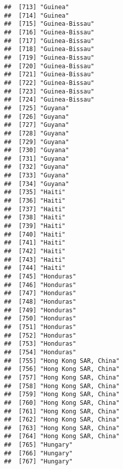 \documentclass[]{article}
\begin{document}
\begin{verbatim}
##  [713] "Guinea"                             
##  [714] "Guinea"                             
##  [715] "Guinea-Bissau"                      
##  [716] "Guinea-Bissau"                      
##  [717] "Guinea-Bissau"                      
##  [718] "Guinea-Bissau"                      
##  [719] "Guinea-Bissau"                      
##  [720] "Guinea-Bissau"                      
##  [721] "Guinea-Bissau"                      
##  [722] "Guinea-Bissau"                      
##  [723] "Guinea-Bissau"                      
##  [724] "Guinea-Bissau"                      
##  [725] "Guyana"                             
##  [726] "Guyana"                             
##  [727] "Guyana"                             
##  [728] "Guyana"                             
##  [729] "Guyana"                             
##  [730] "Guyana"                             
##  [731] "Guyana"                             
##  [732] "Guyana"                             
##  [733] "Guyana"                             
##  [734] "Guyana"                             
##  [735] "Haiti"                              
##  [736] "Haiti"                              
##  [737] "Haiti"                              
##  [738] "Haiti"                              
##  [739] "Haiti"                              
##  [740] "Haiti"                              
##  [741] "Haiti"                              
##  [742] "Haiti"                              
##  [743] "Haiti"                              
##  [744] "Haiti"                              
##  [745] "Honduras"                           
##  [746] "Honduras"                           
##  [747] "Honduras"                           
##  [748] "Honduras"                           
##  [749] "Honduras"                           
##  [750] "Honduras"                           
##  [751] "Honduras"                           
##  [752] "Honduras"                           
##  [753] "Honduras"                           
##  [754] "Honduras"                           
##  [755] "Hong Kong SAR, China"               
##  [756] "Hong Kong SAR, China"               
##  [757] "Hong Kong SAR, China"               
##  [758] "Hong Kong SAR, China"               
##  [759] "Hong Kong SAR, China"               
##  [760] "Hong Kong SAR, China"               
##  [761] "Hong Kong SAR, China"               
##  [762] "Hong Kong SAR, China"               
##  [763] "Hong Kong SAR, China"               
##  [764] "Hong Kong SAR, China"               
##  [765] "Hungary"                            
##  [766] "Hungary"                            
##  [767] "Hungary"                            

\end{verbatim}
\end{document}
